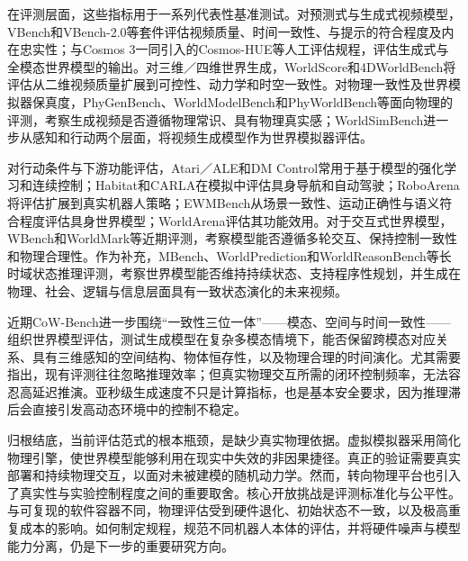 在评测层面，这些指标用于一系列代表性基准测试。对预测式与生成式视频模型，VBench\citep{huang2023vbench}和VBench-2.0\citep{zheng2025vbench}等套件评估视频质量、时间一致性、与提示的符合程度及内在忠实性；与Cosmos 3一同引入的Cosmos-HUE等人工评估规程\citep{nvidia2025cosmos}，评估生成式与全模态世界模型的输出。对三维／四维世界生成，WorldScore\citep{duan2025worldscore}和4DWorldBench\citep{lu20264dworldbench}将评估从二维视频质量扩展到可控性、动力学和时空一致性。对物理一致性及世界模拟器保真度，PhyGenBench\citep{meng2024towards}、WorldModelBench\citep{li2026worldmodelbench}和PhyWorldBench\citep{gu2025phyworldbench}等面向物理的评测，考察生成视频是否遵循物理常识、具有物理真实感；WorldSimBench\citep{qin2024worldsimbench}进一步从感知和行动两个层面，将视频生成模型作为世界模拟器评估。

对行动条件与下游功能评估，Atari／ALE\citep{bellemare2013arcade}和DM Control\citep{tassa2018deepmind}常用于基于模型的强化学习和连续控制；Habitat\citep{savva2019habitat}和CARLA\citep{dosovitskiy2017carla}在模拟中评估具身导航和自动驾驶；RoboArena\citep{atreya2025roboarena}将评估扩展到真实机器人策略；EWMBench\citep{yue2025ewmbench}从场景一致性、运动正确性与语义符合程度评估具身世界模型；WorldArena\citep{shang2026worldarena}评估其功能效用。对于交互式世界模型，WBench\citep{ying2026wbench}和WorldMark\citep{xu2026worldmark}等近期评测，考察模型能否遵循多轮交互、保持控制一致性和物理合理性。作为补充，MBench\citep{zhang2026mbench}、WorldPrediction\citep{chen2025worldprediction}和WorldReasonBench\citep{wu2026worldreasonbench}等长时域状态推理评测，考察世界模型能否维持持续状态、支持程序性规划，并生成在物理、社会、逻辑与信息层面具有一致状态演化的未来视频。

近期CoW-Bench进一步围绕“一致性三位一体”——模态、空间与时间一致性——组织世界模型评估，测试生成模型在复杂多模态情境下，能否保留跨模态对应关系、具有三维感知的空间结构、物体恒存性，以及物理合理的时间演化\citep{wei2026trinityconsistencydefiningprinciple}。尤其需要指出，现有评测往往忽略推理效率；但真实物理交互所需的闭环控制频率，无法容忍高延迟推演。亚秒级生成速度不只是计算指标，也是基本安全要求，因为推理滞后会直接引发高动态环境中的控制不稳定。

归根结底，当前评估范式的根本瓶颈，是缺少真实物理依据。虚拟模拟器采用简化物理引擎，使世界模型能够利用在现实中失效的非因果捷径。真正的验证需要真实部署和持续物理交互，以面对未被建模的随机动力学。然而，转向物理平台也引入了真实性与实验控制程度之间的重要取舍。核心开放挑战是评测标准化与公平性。与可复现的软件容器不同，物理评估受到硬件退化、初始状态不一致，以及极高重复成本的影响。如何制定规程，规范不同机器人本体的评估，并将硬件噪声与模型能力分离，仍是下一步的重要研究方向。

